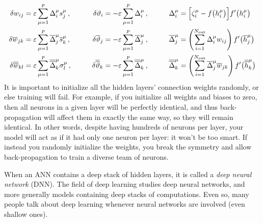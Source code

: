 \begin{alignat}{3}
\delta w_{ij}&=\varepsilon\sum_{\mu=1}^p\Delta_i^\mu s_j^\mu\,, &\qquad \delta\vartheta_i&=-\varepsilon\sum_{\mu=1}^p\Delta_i^\mu\,, &\qquad \Delta_i^\mu&=\Bigl[\zeta_i^\mu-f\bigl(h_i^\mu\bigr)\Bigr]f'\bigl(h_i^\mu\bigr)\\
\delta\overline{w}_{jk}&=\varepsilon\sum_{\mu=1}^p\overline{\Delta}_j^\mu\overline{s}_k^\mu\,, &\qquad \delta\overline{\vartheta}_j&=-\varepsilon\sum_{\mu=1}^p\overline{\Delta}_j^\mu\,, &\qquad \overline{\Delta}_j^\mu&=\left(\sum_{i=1}^{N_{\text{out}}}\Delta_i^\mu w_{ij}\right)f'\bigl(\overline{h}_j^\mu\bigr)\\
\delta\overline{\overline{w}}_{kl}&=\varepsilon\sum_{\mu=1}^p\overline{\overline{\Delta}}_k^\mu\sigma_l^\mu\,, &\qquad \delta\overline{\overline{\vartheta}}_k&=-\varepsilon\sum_{\mu=1}^p\overline{\overline{\Delta}}_k^\mu\,, &\qquad \overline{\overline{\Delta}}_k^\mu&=\left(\sum_{i=1}^{N_{\text{out}}}\overline{\Delta}_j^\mu\overline{w}_{jk}\right)f'\bigl(\overline{\overline{h}}_k^\mu\bigr)
\end{alignat}
It is important to initialize all the hidden layers' connection weights randomly, or else training will fail. For example, if you initialize all weights and biases to zero, then all neurons in a given layer will be perfectly identical, and thus back-propagation will affect them in exactly the same way, so they will remain identical. In other words, despite having hundreds of neurons per layer, your model will act as if it had only one neuron per layer: it won't be too smart. If instead you randomly initialize the weights, you break the symmetry and allow back-propagation to train a diverse team of neurons.

When an ANN contains a deep stack of hidden layers, it is called a \emph{deep neural network} (DNN). The field of deep learning studies deep neural networks, and more generally models containing deep stacks of computations. Even so, many people talk about deep learning whenever neural networks are involved (even shallow ones).


